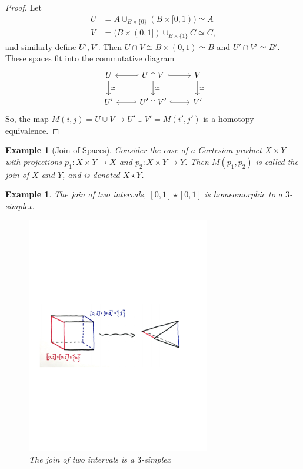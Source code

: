 \documentclass{article}
\newtheorem{example}[theorem]{Example}
\newtheorem{proposed work}[theorem]{Proposed Work}
\begin{document}
\begin{proof}
Let 
\begin{align*}
U &= A \cup_{B \times \{0\}} (B \times [0,1)) \simeq A\\
V &= (B \times (0,1]) \cup_{B \times\{1\}} C \simeq C,
\end{align*}
and similarly define $U', V'$. Then $U \cap V \cong B \times (0,1) \simeq B$ and $U' \cap V' \simeq B'$. These spaces fit into the commutative diagram
\begin{equation*}
\begin{tikzcd}
U \arrow[d, "\simeq"] & U \cap V \arrow[l, hook'] \arrow[r, hook] \arrow[d, "\simeq"] & V \arrow[d, "\simeq"] \\
U' & U' \cap V' \arrow[l, hook'] \arrow[r,hook] & V'
\end{tikzcd}
\end{equation*}
So, the map $M(i,j) = U \cup V \to U' \cup V' = M(i',j')$ is a homotopy equivalence.
\end{proof}

\begin{example}[Join of Spaces]
Consider the case of a Cartesian product $X \times Y$ with projections $p_1: X \times Y \to X$ and $p_2: X \times Y \to Y$. Then $M(p_1, p_2)$ is called the \emph{join} of $X$ and $Y$, and is denoted $X \star Y$. 
\end{example}

\begin{example}
The join of two intervals, $[0,1] \star [0,1]$ is homeomorphic to a $3$-simplex. 
\begin{figure}[h]
\centering
\includegraphics[width=8cm]{joinint}
\caption{The join of two intervals is a $3$-simplex}
\end{figure}
\end{example}
\end{document}
